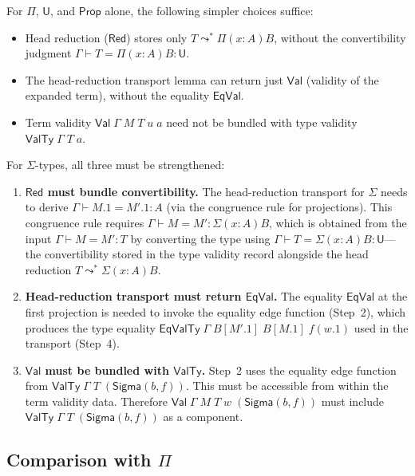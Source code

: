 \documentclass[11pt]{article}
\newcommand{\conveq}[4]{#1 \vdash #2 = #3 : #4}
\newcommand{\Pitype}[2]{\Pi(#1)#2}
\newcommand{\substone}[2]{#1[#2]}
\newcommand{\U}{\mathsf{U}}
\newcommand{\Prop}{\mathsf{Prop}}
\newcommand{\SigmaC}[2]{\mathsf{Sigma}(#1,#2)}
\newcommand{\Red}{\mathrel{\leadsto^*}}
\newcommand{\Sigmatype}[2]{\Sigma(#1)#2}
\newcommand{\Val}{\mathsf{Val}}
\newcommand{\EqVal}{\mathsf{EqVal}}
\newcommand{\ValTy}{\mathsf{ValTy}}
\newcommand{\EqValTy}{\mathsf{EqValTy}}
\newcommand{\pj}[2]{#1\mbox{.}#2}
\begin{document}
For $\Pi$, $\U$, and $\Prop$ alone, the following simpler choices suffice:
\begin{itemize}
\item Head reduction ($\mathsf{Red}$) stores only $T \Red \Pitype{x{:}A}{B}$,
  without the convertibility judgment $\conveq{\Gamma}{T}{\Pitype{x{:}A}{B}}{\U}$.
\item The head-reduction transport lemma can return just $\Val$
  (validity of the expanded term), without the equality $\EqVal$.
\item Term validity $\Val\;\Gamma\;M\;T\;u\;a$ need not be bundled with
  type validity $\ValTy\;\Gamma\;T\;a$.
\end{itemize}
For $\Sigma$-types, all three must be strengthened:
\begin{enumerate}
\item \textbf{$\mathsf{Red}$ must bundle convertibility.}
  The head-reduction transport for $\Sigma$ needs to derive
  $\conveq{\Gamma}{\pj{M}{1}}{\pj{M'}{1}}{A}$ (via the congruence
  rule for projections).  This congruence rule requires
  $\conveq{\Gamma}{M}{M'}{\Sigmatype{x{:}A}{B}}$, which is obtained from
  the input $\conveq{\Gamma}{M}{M'}{T}$ by converting the type using
  $\conveq{\Gamma}{T}{\Sigmatype{x{:}A}{B}}{\U}$---the convertibility
  stored in the type validity record alongside the head reduction
  $T \Red \Sigmatype{x{:}A}{B}$.

\item \textbf{Head-reduction transport must return $\EqVal$.}
  The equality $\EqVal$ at the first projection is needed to invoke
  the equality edge function (Step~2), which produces the type equality
  $\EqValTy\;\Gamma\;\substone{B}{\pj{M'}{1}}\;\substone{B}{\pj{M}{1}}\;f(\pj{w}{1})$
  used in the transport (Step~4).

\item \textbf{$\Val$ must be bundled with $\ValTy$.}
  Step~2 uses the equality edge function from
  $\ValTy\;\Gamma\;T\;(\SigmaC{b}{f})$.
  This must be accessible from within the term validity data.
  Therefore $\Val\;\Gamma\;M\;T\;w\;(\SigmaC{b}{f})$ must include
  $\ValTy\;\Gamma\;T\;(\SigmaC{b}{f})$ as a component.
\end{enumerate}

\subsection{Comparison with $\Pi$}
\end{document}
